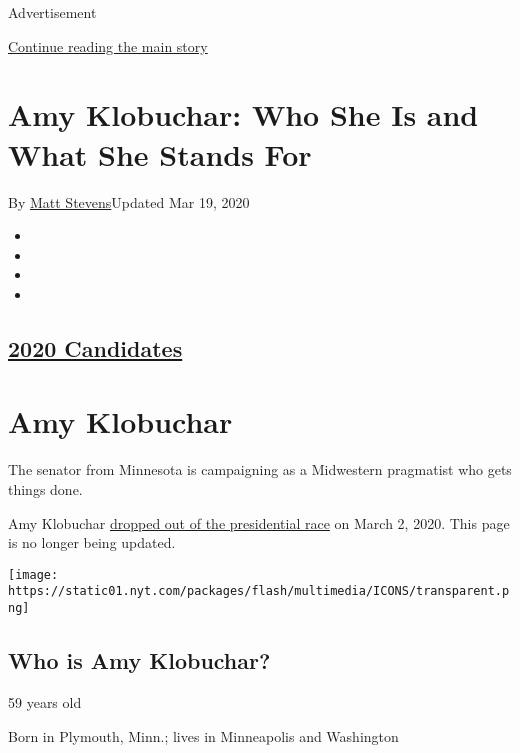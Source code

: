 Advertisement

\protect\hyperlink{after-top}{Continue reading the main story}

\hypertarget{amy-klobuchar-who-she-is-and-what-she-stands-for}{%
\section{Amy Klobuchar: Who She Is and What She Stands
For}\label{amy-klobuchar-who-she-is-and-what-she-stands-for}}

By \href{https://www.nytimes.com/by/matt-stevens}{Matt Stevens}Updated
Mar 19, 2020

\begin{itemize}
\item
\item
\item
\item
\end{itemize}

\hypertarget{2020-candidates}{%
\subsection{\texorpdfstring{\href{https://www.nytimes.com/interactive/2019/us/politics/2020-presidential-candidates.html}{2020
Candidates}}{2020 Candidates}}\label{2020-candidates}}

\hypertarget{amy-klobuchar}{%
\section{Amy Klobuchar}\label{amy-klobuchar}}

The senator from Minnesota is campaigning as a Midwestern pragmatist who
gets things done.

Amy Klobuchar
\href{https://www.nytimes.com/2020/03/02/us/politics/amy-klobuchar-drops-out.html}{dropped
out of the presidential race} on March 2, 2020. This page is no longer
being updated.

\texttt{[image: https://static01.nyt.com/packages/flash/multimedia/ICONS/transparent.png]}

\hypertarget{who-is-amy-klobuchar}{%
\subsection{Who is Amy Klobuchar?}\label{who-is-amy-klobuchar}}

59 years old

Born in Plymouth, Minn.; lives in Minneapolis and Washington

